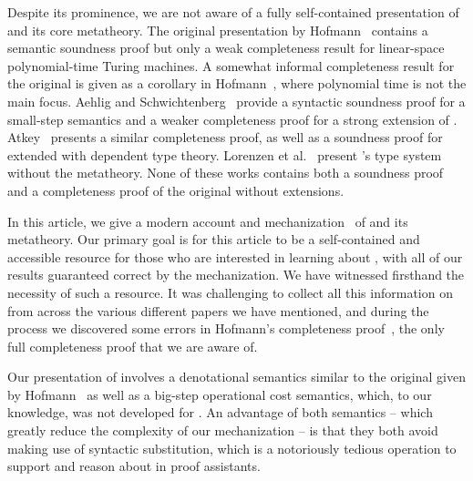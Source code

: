 Despite its prominence, we are not aware of a fully self-contained presentation of \lfpl and its core metatheory. The original presentation by Hofmann~\cite{hofmannLinearTypesNonsizeincreasing1999} contains a semantic soundness proof but only a weak completeness result for linear-space polynomial-time Turing machines. A somewhat informal completeness result for the original \lfpl is given as a corollary in Hofmann~\cite{hofmannStrengthNonsizeIncreasing2002}, where polynomial time is not the main focus. Aehlig and Schwichtenberg~\cite{aehligSyntacticalAnalysisNonsizeincreasing2002} provide a syntactic soundness proof for a small-step semantics and a weaker completeness proof for a strong extension of \lfpl. Atkey~\cite{atkeyPolynomialTimeDependent2024} presents a similar completeness proof, as well as a soundness proof for \lfpl extended with dependent type theory. Lorenzen et al.~\cite{lorenzenFP2FullyInPlace2023} present \lfpl's type system without the metatheory. None of these works contains both a soundness proof and a completeness proof of the original \lfpl without extensions.

In this article, we give a modern account and mechanization~\cite{mechanization} of \lfpl and its metatheory. Our primary goal is for this article to be a self-contained and accessible resource for those who are interested in learning about \lfpl, with all of our results guaranteed correct by the mechanization. We have witnessed firsthand the necessity of such a resource. It was challenging to collect all this information on \lfpl from across the various different papers we have mentioned, and during the process we discovered some errors in Hofmann's completeness proof~\cite{hofmannStrengthNonsizeIncreasing2002}, the only full completeness proof that we are aware of.

Our presentation of \lfpl involves a denotational semantics similar to the original given by Hofmann~\cite{hofmannLinearTypesNonsizeincreasing1999} as well as a big-step operational cost semantics, which, to our knowledge, was not developed for \lfpl. An advantage of both semantics -- which greatly reduce the complexity of our mechanization -- is that they both avoid making use of syntactic substitution, which is a notoriously tedious operation to support and reason about in proof assistants.

